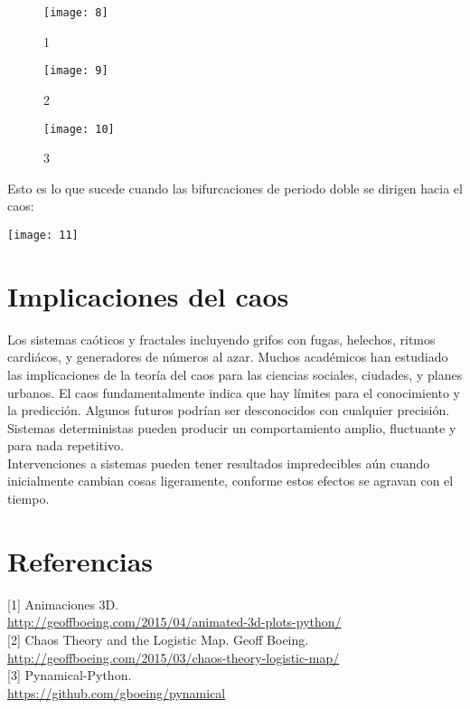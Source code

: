 \documentclass[12pt]{article}
\begin{document}
\begin{figure}[!htb]
  \texttt{[image: 8]}
  \caption{1}\label{1}
\endminipage\hfill
{}
  \texttt{[image: 9]}
  \caption{2}\label{2}
\endminipage\hfill
{}%
  \texttt{[image: 10]}
  \caption{3}\label{3}
\endminipage
\end{figure}

Esto es lo que sucede cuando las bifurcaciones de periodo doble se dirigen hacia el caos:

\begin{center}
\texttt{[image: 11]}
\end{center}


\newpage
\section*{Implicaciones del caos}
Los sistemas caóticos y fractales incluyendo grifos con fugas, helechos, ritmos cardiácos, y generadores de números al azar. Muchos académicos han estudiado las implicaciones de la teoría del caos para las ciencias sociales, ciudades, y planes urbanos. El caos fundamentalmente indica que hay límites para el conocimiento y la predicción. Algunos futuros podrían ser desconocidos con cualquier precisión. Sistemas deterministas pueden producir un comportamiento amplio, fluctuante y para nada repetitivo.\\

Intervenciones a sistemas pueden tener resultados impredecibles aún cuando inicialmente cambian cosas ligeramente, conforme estos efectos se agravan con el tiempo. 

\newpage
\section*{Referencias}

[1] Animaciones 3D.\\ \url{http://geoffboeing.com/2015/04/animated-3d-plots-python/}\\

[2] Chaos Theory and the Logistic Map. Geoff Boeing.\\ \url{http://geoffboeing.com/2015/03/chaos-theory-logistic-map/}\\

[3] Pynamical-Python.\\ \url{https://github.com/gboeing/pynamical}\\



    
    
    
    
    
    
    
    
    
    
    
    
    
    
    
    
\end{document}
